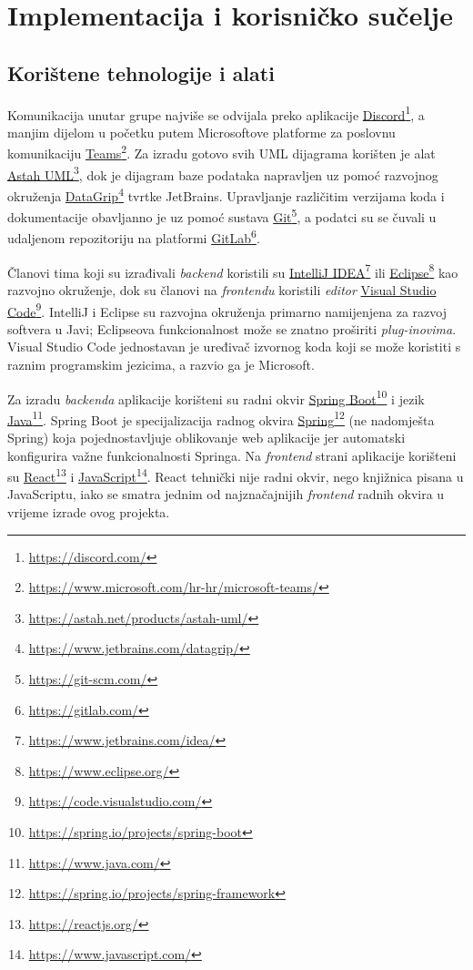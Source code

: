 \chapter{Implementacija i korisničko sučelje}
		
		
		\section{Korištene tehnologije i alati}
		
			
			{Komunikacija unutar grupe najviše se odvijala preko aplikacije \underline{Discord}\footnote{\url{https://discord.com/}}, a manjim dijelom u početku putem Microsoftove platforme za poslovnu komunikaciju \underline{Teams}\footnote{\url{https://www.microsoft.com/hr-hr/microsoft-teams/}}. Za izradu gotovo svih UML dijagrama korišten je alat \underline{Astah UML}\footnote{\url{https://astah.net/products/astah-uml/}}, dok je dijagram baze podataka napravljen uz pomoć razvojnog okruženja \underline{DataGrip}\footnote{\url{https://www.jetbrains.com/datagrip/}} tvrtke JetBrains. Upravljanje različitim verzijama koda i dokumentacije obavljanno je uz pomoć sustava \underline{Git}\footnote{\url{https://git-scm.com/}}, a podatci su se čuvali u udaljenom repozitoriju na platformi \underline{GitLab}\footnote{\url{https://gitlab.com/}}.}
			
			{Članovi tima koji su izrađivali \textit{backend} koristili su \underline{IntelliJ IDEA}\footnote{\url{https://www.jetbrains.com/idea/}} ili \underline{Eclipse}\footnote{\url{https://www.eclipse.org/}} kao razvojno okruženje, dok su članovi na \textit{frontendu} koristili \textit{editor} \underline{Visual Studio Code}\footnote{\url{https://code.visualstudio.com/}}. IntelliJ i Eclipse su razvojna okruženja primarno namijenjena za razvoj softvera u Javi; Eclipseova funkcionalnost može se znatno proširiti \textit{plug-inovima}. Visual Studio Code jednostavan je uređivač izvornog koda koji se može koristiti s raznim programskim jezicima, a razvio ga je Microsoft.}
			
			{Za izradu \textit{backenda} aplikacije korišteni su radni okvir \underline{Spring Boot}\footnote{\url{https://spring.io/projects/spring-boot}} i jezik \underline{Java}\footnote{\url{https://www.java.com/}}. Spring Boot je specijalizacija radnog okvira \underline{Spring}\footnote{\url{https://spring.io/projects/spring-framework}} (ne nadomješta Spring) koja pojednostavljuje oblikovanje web aplikacije jer automatski konfigurira važne funkcionalnosti Springa. Na \textit{frontend} strani aplikacije korišteni su \underline{React}\footnote{\url{https://reactjs.org/}} i \underline{JavaScript}\footnote{\url{https://www.javascript.com/}}. React tehnički nije radni okvir, nego knjižnica pisana u JavaScriptu, iako se smatra jednim od najznačajnijih \textit{frontend} radnih okvira u vrijeme izrade ovog projekta.}
			
